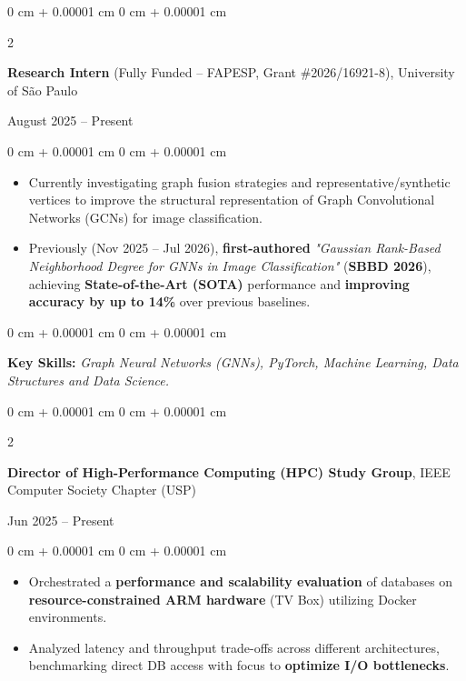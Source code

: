 \documentclass[10pt, letterpaper]{article}
\newenvironment{highlights}{
    \begin{itemize}[
        topsep=0.10 cm,
        parsep=0.10 cm,
        partopsep=0pt,
        itemsep=0pt,
        leftmargin=0 cm + 10pt
    ]
}{
    \end{itemize}
} %
\newenvironment{onecolentry}{
    \begin{adjustwidth}{
        0 cm + 0.00001 cm
    }{
        0 cm + 0.00001 cm
    }
}{
    \end{adjustwidth}
} %
\newenvironment{twocolentry}[2][]{
    \onecolentry
    \def\secondColumn{#2}
    \setcolumnwidth{\fill, 4.5 cm}
    \begin{paracol}{2}
}{
    \switchcolumn \raggedleft \secondColumn
    \end{paracol}
    \endonecolentry
} %
\begin{document}
\begin{twocolentry}{
    August 2025 – Present
}
    \textbf{Research Intern} (Fully Funded -- FAPESP, Grant \#2026/16921-8), University of São Paulo
\end{twocolentry}

\vspace{0.10 cm}
\begin{onecolentry}
    \begin{highlights}
        \setlength{\rightskip}{1.0cm}
        \setlength{\leftskip}{0.3cm}
        \item Currently investigating graph fusion strategies and representative/synthetic vertices to improve the structural representation of Graph Convolutional Networks (GCNs) for image classification.
        \item Previously (Nov 2025 -- Jul 2026), \textbf{first-authored} \textit{"Gaussian Rank-Based Neighborhood Degree for GNNs in Image Classification"} (\textbf{SBBD 2026}), achieving \textbf{State-of-the-Art (SOTA)} performance and \textbf{improving accuracy by up to 14\%} over previous baselines.
    \end{highlights}
\end{onecolentry}

\vspace{0.15 cm}
\begin{onecolentry}
    \setlength{\leftskip}{0.3cm}
    {\footnotesize \textbf{Key Skills:} \textit{Graph Neural Networks (GNNs), PyTorch, Machine Learning, Data Structures and Data Science.}}
\end{onecolentry}
\vspace{0.20 cm}
\begin{twocolentry}{
    Jun 2025 – Present
}
    \textbf{Director of High-Performance Computing (HPC) Study Group}, IEEE Computer Society Chapter (USP)
\end{twocolentry}

\vspace{0.10 cm}
\begin{onecolentry}
    \begin{highlights}
        \setlength{\rightskip}{1.0cm}
        \setlength{\leftskip}{0.3cm}
        \item Orchestrated a \textbf{performance and scalability evaluation} of databases on \textbf{resource-constrained ARM hardware} (TV Box) utilizing Docker environments.
        \item Analyzed latency and throughput trade-offs across different architectures, benchmarking direct DB access with focus to \textbf{optimize I/O bottlenecks}.
    \end{highlights}
\end{onecolentry}
\end{document}
